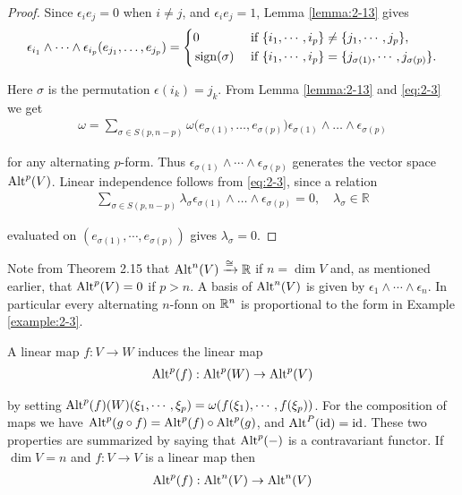\begin{proof}
  Since $\epsilon_i{e_j} = 0$ when $i\neq j$, and $\epsilon_i{e_j}= 1$, Lemma \ref{lemma:2-13} gives 
  \begin{align}\label{eq:2-3}
    \epsilon_{i_1}\wedge\cdots\wedge\epsilon_{i_p}(e_{j_1},\ldots,e_{j_p})
    = \left\{\begin{aligned}
      & 0             && \text{ if } \{i_1, \cdots, i_p\}\neq \{j_1, \cdots, j_p\},\\
      & \operatorname{sign}(\sigma) && \text{ if } \{i_1, \cdots, i_p\} = \{j_{\sigma(1)}, \cdots, j_{\sigma(p)}\}.
    \end{aligned}\right.
  \end{align}

  Here $\sigma$ is the permutation $\epsilon(i_k) = j_k$. From Lemma \ref{lemma:2-13} and \eqref{eq:2-3} we get
  \begin{align*}
    \omega = \sum_{\sigma\in S(p,n-p)}\omega\big(e_{\sigma(1)},\ldots,e_{\sigma(p)}\big)
      \epsilon_{\sigma(1)}\wedge\ldots\wedge\epsilon_{\sigma(p)}
  \end{align*}

  for any alternating $p$-form. Thus $\epsilon_{\sigma(1)}\wedge\cdots\wedge\epsilon_{\sigma(p)}$ generates 
  the vector space $\operatorname{Alt}^p(V)$. Linear independence follows from \eqref{eq:2-3}, since a relation
  \begin{align*}
    \sum_{\sigma\in S(p,n-p)}\lambda_{\sigma}\epsilon_{\sigma(1)}\wedge\ldots\wedge\epsilon_{\sigma(p)}=0,\quad\lambda_{\sigma}\in\mathbb{R}
  \end{align*}

  evaluated on $(e_{\sigma(1)}, \cdots, e_{\sigma(p)})$ gives $\lambda_{\sigma} = 0$.
\end{proof}

Note from Theorem 2.15 that $\operatorname{Alt}^n(V)\xrightarrow[]{\cong}\mathbb{R}$ if $n = \dim V$ and, as mentioned
earlier, that $\operatorname{Alt}^p(V) = 0$ if $p > n$. A basis of $\operatorname{Alt}^n(V)$ is given by $\epsilon_{1}\wedge\cdots\wedge\epsilon_{n}$.
In particular every alternating $n$-fonn on $\mathbb{R}^n$ is proportional to the form in Example \ref{example:2-3}.

A linear map $f:V\to W$ induces the linear map 
\begin{align}\label{eq:2-4}
  \operatorname{Alt}^p(f): \operatorname{Alt}^p(W)\to\operatorname{Alt}^p(V)
\end{align}

by setting $\operatorname{Alt}^p(f)(W)(\xi_1, \cdots, \xi_p) = \omega(f(\xi_1), \cdots, f(\xi_p))$. For the composition of
maps we have $\operatorname{Alt}^p(g\circ f) = \operatorname{Alt}^p(f)\circ\operatorname{Alt}^p(g)$, and $\operatorname{Alt}^P(\operatorname{id}) = \operatorname{id}$. These two
properties are summarized by saying that $\operatorname{Alt}^p(-)$ is a contravariant functor. If $\dim V = n$ and 
$f:V\to V$ is a linear map then
\begin{align*}
  \operatorname{Alt}^p(f): \operatorname{Alt}^n(V)\to\operatorname{Alt}^n(V)
\end{align*}


